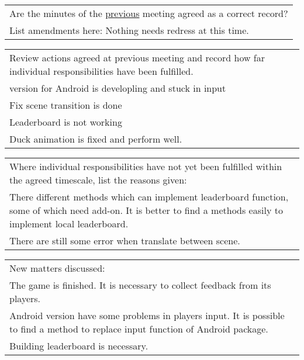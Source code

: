 \documentclass{article}
\begin{document}
\begin{table}[H]
	\centering
	\begin{tabular}{| p{12cm}  |}
	\hline
	Are the minutes of the \underline{previous} meeting agreed as a correct record? \\ 
	List amendments here: Nothing needs redress at this time.\\ \hline
\end{tabular}
\end{table}

\begin{table}[H]
	\centering
	\begin{tabular}{| p{12cm}  |}
	\hline
	Review actions agreed at previous meeting and record how far individual responsibilities have been fulfilled. \\ 
	version for Android is developling and stuck in input\\  
	Fix scene transition is done\\  
	Leaderboard is not working\\
	Duck animation is fixed and perform well.\\ \hline
\end{tabular}
\end{table}

\begin{table}[H]
	\centering
	\begin{tabular}{| p{12cm}  |}
	\hline
	Where individual responsibilities have not yet been fulfilled within the agreed timescale, list the reasons given: \\
	There different methods which can implement leaderboard function, some of which need add-on. It is better to find a methods easily to implement local leaderboard. \\ 
	There are still some error when translate between scene. 
	\hline
\end{tabular}
\end{table}

\begin{table}[H]
	\centering
	\begin{tabular}{| p{12cm}  |}
	\hline
	New matters discussed: \\ 
	The game is finished. It is necessary to collect feedback from its players.\\ 
	Android version have some problems in players input. It is possible to find a method to replace input function of Android package.\\
	Building leaderboard is necessary.\\
	\hline
\end{tabular}
\end{table}
\end{document}
